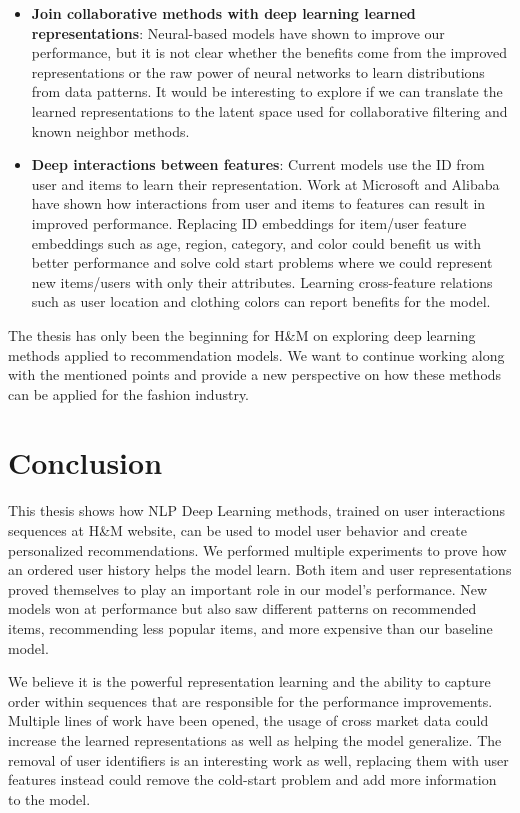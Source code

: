 \documentclass{tex_files/kththesis}
\begin{document}
\begin{itemize}
    \item \textbf{Join collaborative methods with deep learning learned representations}: Neural-based models have shown to improve our performance, but it is not clear whether the benefits come from the improved representations or the raw power of neural networks to learn distributions from data patterns. It would be interesting to explore if we can translate the learned representations to the latent space used for collaborative filtering and known neighbor methods.
    
    \item \textbf{Deep interactions between features}: Current models use the ID from user and items to learn their representation. Work at Microsoft \cite{xDeepFM} and Alibaba \cite{alibaba} have shown how interactions from user and items to features can result in improved performance. Replacing ID embeddings for item/user feature embeddings such as age, region, category, and color could benefit us with better performance and solve cold start problems where we could represent new items/users with only their attributes. Learning cross-feature relations such as user location and clothing colors can report benefits for the model.
\end{itemize}

The thesis has only been the beginning for H\&M on exploring deep learning methods applied to recommendation models. We want to continue working along with the mentioned points and provide a new perspective on how these methods can be applied for the fashion industry. 

\newpage
\section{Conclusion}

This thesis shows how NLP Deep Learning methods, trained on user interactions sequences at H\&M website, can be used to model user behavior and create personalized recommendations. We performed multiple experiments to prove how an ordered user history helps the model learn. Both item and user representations proved themselves to play an important role in our model's performance. New models won at performance but also saw different patterns on recommended items, recommending less popular items, and more expensive than our baseline model.

We believe it is the powerful representation learning and the ability to capture order within sequences that are responsible for the performance improvements. Multiple lines of work have been opened, the usage of cross market data could increase the learned representations as well as helping the model generalize. The removal of user identifiers is an interesting work as well, replacing them with user features instead could remove the cold-start problem and add more information to the model.
\end{document}
